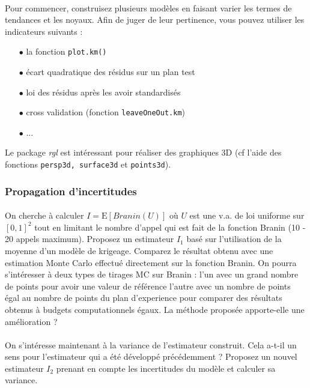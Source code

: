 \documentclass[11pt]{scrartcl}
\begin{document}
\paragraph{}
Pour commencer, construisez plusieurs modèles en faisant varier les termes de tendances et les noyaux. Afin de juger de leur pertinence, vous pouvez utiliser les indicateurs suivants :
\begin{itemize}
	\item[$\bullet$] la fonction \texttt{plot.km()}
	\item[$\bullet$]  écart quadratique des résidus sur un plan test
	\item[$\bullet$]  loi des résidus après les avoir standardisés
	\item[$\bullet$]  cross validation (fonction \texttt{leaveOneOut.km})
	\item[$\bullet$]  ...
\end{itemize}

Le package \emph{rgl} est intéressant pour réaliser des graphiques 3D (cf l'aide des fonctions \texttt{persp3d, surface3d} et \texttt{points3d}).

\subsubsection*{Propagation d'incertitudes}
\paragraph{}
On cherche à calculer $I=\mathrm{E}[Branin(U)]$ où $U$ est une v.a. de loi uniforme sur $[0,1]^2$ tout en limitant le nombre d'appel qui est fait de la fonction Branin (10 - 20 appels maximum). Proposez un estimateur $I_1$ basé sur l'utilisation de la moyenne d'un modèle de krigeage. Comparez le résultat obtenu avec une estimation Monte Carlo effectué directement sur la fonction Branin. On pourra s'intéresser à deux types de tirages MC sur Branin : l'un avec un grand nombre de points pour avoir une valeur de référence l'autre avec un nombre de points égal au nombre de points du plan d'experience pour comparer des résultats obtenus à budgets computationnels égaux. La méthode proposée apporte-elle une amélioration ?

\paragraph{}
On s'intéresse maintenant à la variance de l'estimateur construit. Cela a-t-il un sens pour l'estimateur qui a été développé précédemment ? Proposez un nouvel estimateur $I_2$ prenant en compte les incertitudes du modèle et calculer sa variance.
\end{document}
